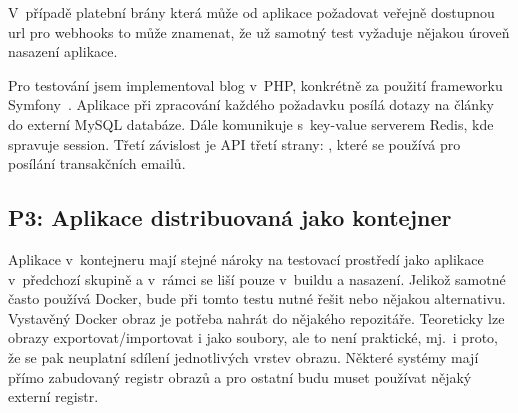         V~případě platební brány která může od aplikace požadovat veřejně dostupnou url pro webhooks to může znamenat, že už samotný test vyžaduje nějakou úroveň nasazení aplikace.

        Pro testování jsem implementoval blog v~PHP, konkrétně za použití frameworku Symfony~\cite{symfony}. Aplikace při zpracování každého požadavku posílá dotazy na články do externí MySQL databáze. Dále komunikuje s~key-value serverem Redis, kde spravuje session. Třetí závislost je API třetí strany: , které se používá pro posílání transakčních emailů.

    \subsection{P3: Aplikace distribuovaná jako kontejner}
        Aplikace v~kontejneru mají stejné nároky na testovací prostředí jako aplikace v~předchozí skupině a v~rámci \CICD se liší pouze v~buildu a nasazení. Jelikož samotné \CI často používá Docker, bude při tomto testu nutné řešit  nebo nějakou alternativu. Vystavěný Docker obraz je potřeba nahrát do nějakého repozitáře. Teoreticky lze obrazy exportovat/importovat i jako soubory, ale to není praktické, mj.~i proto, že se pak neuplatní sdílení jednotlivých vrstev obrazu. Některé systémy mají přímo zabudovaný registr obrazů a pro ostatní budu muset používat nějaký externí registr.
